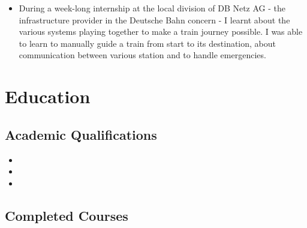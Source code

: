 \documentclass[11pt,a4paper,sans]{moderncv}        %
\begin{document}
\begin{itemize}
\item{
{\vspace{3pt}
During a week-long internship at the local division of DB Netz AG - the infrastructure provider in the Deutsche Bahn concern - I learnt about the various systems playing together to make a train journey possible. I was able to
learn to manually guide a train from start to its destination, about communication between various station and to handle emergencies.}}


\end{itemize}

\section{Education}

\vspace{5pt}

\subsection{Academic Qualifications}

\vspace{5pt}

\begin{itemize}

\item{}

\item{}  %

\item{}

\end{itemize}

\vspace{2pt}

\subsection{Completed Courses}

\vspace{5pt}
\end{document}

